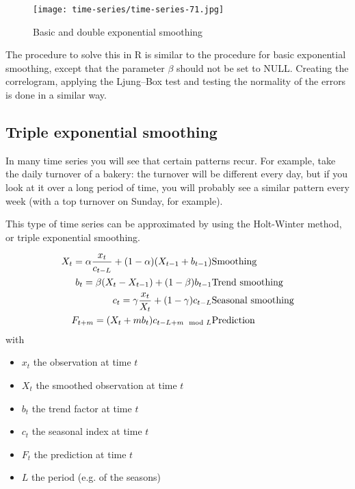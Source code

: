 \begin{figure}
	\centering
		\texttt{[image: time-series/time-series-71.jpg]}
	\caption{Basic and double exponential smoothing}
	\label{fig:time-series-71}
\end{figure}

The procedure to solve this in R is similar to the procedure for basic exponential smoothing, except that the parameter $\beta$ should not be set to NULL. Creating the correlogram, applying the Ljung–Box test and testing the normality of the errors is done in a similar way.

\subsection{Triple exponential smoothing}

In many time series you will see that certain patterns recur. For example, take the daily turnover of a bakery: the turnover will be different every day, but if you look at it over a long period of time, you will probably see a similar pattern every week (with a top turnover on Sunday, for example).

This type of time series can be approximated by using the Holt-Winter method, or triple exponential smoothing.

\begin{eqnarray}
  X_{t} = \alpha \frac{x_{t}}{c_{t-L}} + (1-\alpha) (X_{t-1} + b_{t-1}) & \textnormal{Smoothing}\\
  b_{t} = \beta (X_{t} - X_{t-1}) + (1-\beta)b_{t-1} & \textnormal{Trend smoothing} \\
  c_{t} = \gamma \frac{x_{t}}{X_{t}} + (1-\gamma)c_{t-L} & \textnormal{Seasonal smoothing} \\
  F_{t+m} = (X_{t} + mb_{t})c_{t-L+m \mod L}  & \textnormal{Prediction}
  \label{eq:HoltWinters}
\end{eqnarray}
 with
\begin{itemize}
	\item $x_{t}$ the observation at time $t$
	\item $X_{t}$ the smoothed observation at time $t$
	\item $b_{t}$ the trend factor at time $t$
	\item $c_{t}$ the seasonal index at time $t$
	\item $F_{t}$ the prediction at time $t$
	\item $L$ the period (e.g. of the seasons)
\end{itemize}

